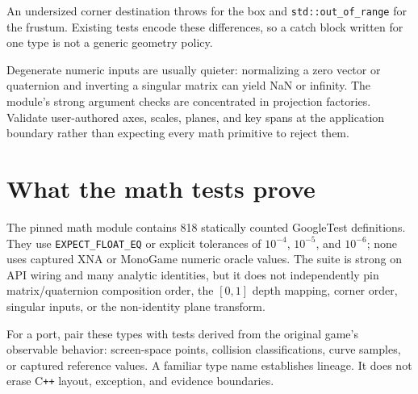 An undersized corner destination
throws  for the box and \texttt{std::out\_of\_range} for the
frustum.  Existing tests encode these differences, so a catch block written for one type is not a
generic geometry policy.

Degenerate numeric inputs are usually quieter: normalizing a zero vector or quaternion and
inverting a singular matrix can yield NaN or infinity.  The module's strong argument checks are
concentrated in projection factories.  Validate user-authored axes, scales, planes, and key spans at
the application boundary rather than expecting every math primitive to reject them.

\section{What the math tests prove}

The pinned math module contains 818 statically counted GoogleTest definitions.  They use
\texttt{EXPECT\_FLOAT\_EQ} or explicit tolerances of \(10^{-4}\), \(10^{-5}\), and \(10^{-6}\);
none uses captured XNA or MonoGame numeric oracle values.  The suite is strong on API wiring and
many analytic identities, but it does not independently pin matrix/quaternion composition order,
the \([0,1]\) depth mapping, corner order, singular inputs, or the non-identity plane transform.

For a port, pair these types with tests derived from the original game's observable behavior:
screen-space points, collision classifications, curve samples, or captured reference values.  A
familiar type name establishes lineage.  It does not erase C\texttt{++} layout, exception, and
evidence boundaries.
